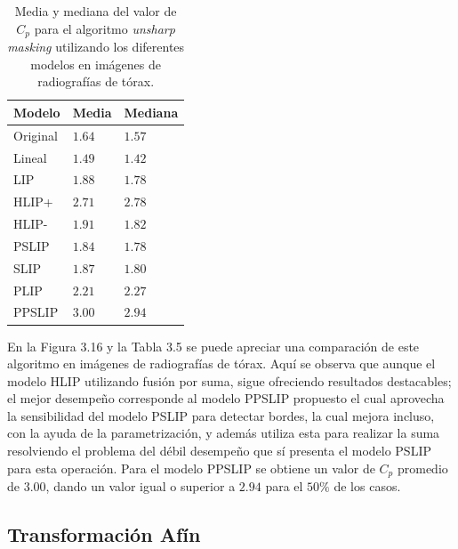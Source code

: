 \begin{table}
	\begin{center}
		\begin{tabular}{|l|l|l|}
			\hline 
			Modelo & Media & Mediana\\
			\hline
			Original & $1.64$ & $1.57$\\
			\hline
			Lineal & $1.49$ & $1.42$\\
			\hline
			LIP & $1.88$ & $1.78$\\
			\hline
			HLIP+ & $2.71$ & $2.78$\\
			\hline
			HLIP- & $1.91$ & $1.82$\\
			\hline
			PSLIP & $1.84$ & $1.78$\\
			\hline
			SLIP & $1.87$ & $1.80$\\
			\hline
			PLIP & $2.21$ & $2.27$\\
			\hline
			PPSLIP & $3.00$ & $2.94$\\
			\hline
		\end{tabular}
		\caption{Media y mediana del valor de $C_p$ para el algoritmo \textit{unsharp masking} utilizando los diferentes modelos en im\'agenes de radiograf\'ias de t\'orax.}
	\end{center}
\end{table}

En la Figura 3.16 y la Tabla 3.5 se puede apreciar una comparaci\'on de este algoritmo en im\'agenes de radiograf\'ias de t\'orax. Aqu\'i se observa que aunque el modelo HLIP  utilizando fusi\'on por suma, sigue ofreciendo resultados destacables; el mejor desempe\~no corresponde al modelo PPSLIP propuesto el cual aprovecha la sensibilidad del modelo PSLIP para detectar bordes, la cual mejora incluso, con la ayuda de la parametrizaci\'on, y adem\'as utiliza esta para realizar la suma resolviendo el problema del d\'ebil desempe\~no que s\'i presenta el modelo PSLIP para esta operaci\'on. Para el modelo PPSLIP se obtiene un valor de $C_p$ promedio de $3.00$, dando un valor igual o superior a $2.94$ para el $50\%$ de los casos.

\subsection{Transformaci\'on Af\'in}

